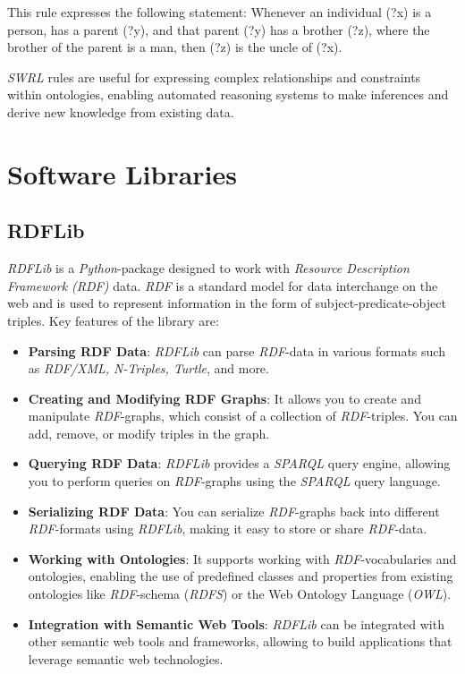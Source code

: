 	This rule expresses the following statement:
	Whenever an individual (?x) is a person, has a parent (?y), and that parent (?y) has a brother (?z), where the brother of the parent is a man, then (?z) is the uncle of (?x).
	
	\textit{SWRL} \cite{Horrocks2004} rules are useful for expressing complex relationships and constraints within ontologies, enabling automated reasoning systems to make inferences and derive new knowledge from existing data.

	\section{Software Libraries}
\label{sec:Libraries}
\subsection{RDFLib}
\label{sec:RDFLib}
\textit{RDFLib} \cite{Krech_RDFLib_2023} is a \textit{Python}-package designed to work with \textit{Resource Description Framework (RDF)} data. \textit{RDF} is a standard model for data interchange on the web and is used to represent information in the form of subject-predicate-object triples. Key features of the library are:

\begin{itemize}
    \item \textbf{Parsing RDF Data}: \textit{RDFLib} can parse \textit{RDF}-data in various formats such as \textit{RDF/XML, N-Triples, Turtle}, and more.
    
    \item \textbf{Creating and Modifying RDF Graphs}: It allows you to create and manipulate \textit{RDF}-graphs, which consist of a collection of \textit{RDF}-triples. You can add, remove, or modify triples in the graph.
    
    \item \textbf{Querying RDF Data}: \textit{RDFLib} provides a \textit{SPARQL} query engine, allowing you to perform queries on \textit{RDF}-graphs using the \textit{SPARQL} query language.
    
    \item \textbf{Serializing RDF Data}: You can serialize \textit{RDF}-graphs back into different \textit{RDF}-formats using \textit{RDFLib}, making it easy to store or share \textit{RDF}-data.
    
    \item \textbf{Working with Ontologies}: It supports working with \textit{RDF}-vocabularies and ontologies, enabling the use of predefined classes and properties from existing ontologies like \textit{RDF}-schema (\textit{RDFS}) or the Web Ontology Language (\textit{OWL}).
    
    \item \textbf{Integration with Semantic Web Tools}: \textit{RDFLib} can be integrated with other semantic web tools and frameworks, allowing to build applications that leverage semantic web technologies.
\end{itemize}

